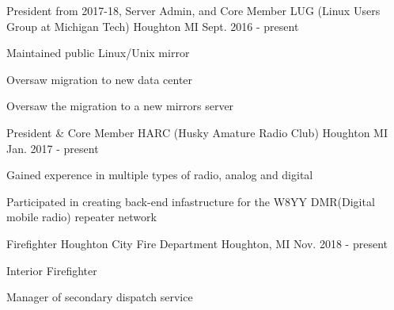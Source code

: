 

\begin{cventries}

  \cventry
    {President from 2017-18, Server Admin, and Core Member} %
    {LUG (Linux Users Group at Michigan Tech)} %
    {Houghton MI} %
    {Sept. 2016 - present} %
    {
      \begin{cvitems} %
        \item {Maintained public Linux/Unix mirror}
        \item {Oversaw migration to new data center}
        \item {Oversaw the migration to a new mirrors server}
      \end{cvitems}
    }

  \cventry
    {President \& Core Member} %
    {HARC (Husky Amature Radio Club)} %
    {Houghton MI} %
    {Jan. 2017 - present} %
    {
      \begin{cvitems} %
        \item {Gained experence in multiple types of radio, analog and digital}
        \item {Participated in creating back-end infastructure for the W8YY DMR(Digital mobile radio) repeater network}
      \end{cvitems}
    }


  \cventry
    {Firefighter} %
    {Houghton City Fire Department} %
    {Houghton, MI} %
    {Nov. 2018 - present} %
    {
      \begin{cvitems} %
        \item {Interior Firefighter}
        \item {Manager of secondary dispatch service}
      \end{cvitems}
    }



\end{cventries}
